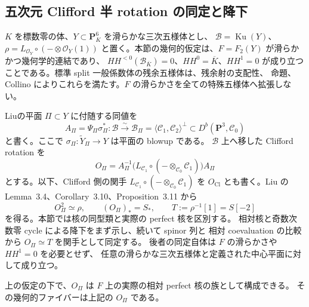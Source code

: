 \subsection{五次元 Clifford 半 rotation の同定と降下}

$K$ を標数零の体、$Y\subset\mathbf P^6_K$ を滑らかな三次五様体とし、
$\mathcal B=\operatorname{Ku}(Y)$、$\rho=L_{\mathcal O_Y}\circ(-\otimes\mathcal O_Y(1))$
と置く。本節の幾何的仮定は、$F=F_2(Y)$ が滑らかかつ幾何学的連結であり、
$HH^{<0}(\mathcal B_{\overline K})=0$、$HH^0=\overline K$、$HH^1=0$
が成り立つことである。標準 split 一般係数体の残余五様体は、残余射の支配性、
命題、Collino\cite[Propositions~1.8, 1.10]{NFMCollinoFivefold}
によりこれらを満たす。$F$ の滑らかさを全ての特殊五様体へ拡張しない。

Liu\cite[Theorem~2.8]{NFMPeizeLiuFivefold}の平面 $\Pi\subset Y$ に付随する同値を
\[
 A_\Pi=\Psi_\Pi\sigma_\Pi^*:
 \mathcal B\xrightarrow{\sim}
 \mathcal B_\Pi=\langle\mathcal C_1,\mathcal C_2\rangle^\perp
 \subset D^b(\mathbf P^3,\mathcal C_0)
\]
と書く。ここで $\sigma_\Pi:\widetilde Y_\Pi\to Y$ は平面の blowup である。
$\mathcal B$ 上へ移した Clifford rotation を
\[
 O_\Pi=A_\Pi^{-1}
       \bigl(L_{\mathcal C_1}\circ(-\otimes_{\mathcal C_0}\mathcal C_1)\bigr)A_\Pi
\]
とする。以下、Clifford 側の関手
$L_{\mathcal C_1}\circ(-\otimes_{\mathcal C_0}\mathcal C_1)$ を
$O_{\mathrm{Cl}}$ とも書く。Liu の Lemma~3.4、Corollary~3.10、Proposition~3.11 から
\begin{equation}\label{eq:nfm-fivefold-clifford-half-rotation}
 O_\Pi^2\simeq\rho,\qquad
 (O_\Pi)_*=S_*,\qquad
 T:=\rho^{-1}[1]=S[-2]
\end{equation}
を得る。本節では核の同型類と実際の perfect 核を区別する。
相対核と奇数次数零 cycle による降下をまず示し、続いて spinor 列と
相対 coevaluation の比較から $O_\Pi\simeq T$ を関手として同定する。
後者の同定自体は $F$ の滑らかさや $HH^1=0$ を必要とせず、
任意の滑らかな三次五様体と定義された中心平面に対して成り立つ。

\begin{lemma}
\label{lem:nfm-fivefold-clifford-relative-kernel}
上の仮定の下で、$O_\Pi$ は $F$ 上の実際の相対 perfect 核の族として構成できる。
その幾何的ファイバーは上記の $O_\Pi$ である。
\end{lemma}

